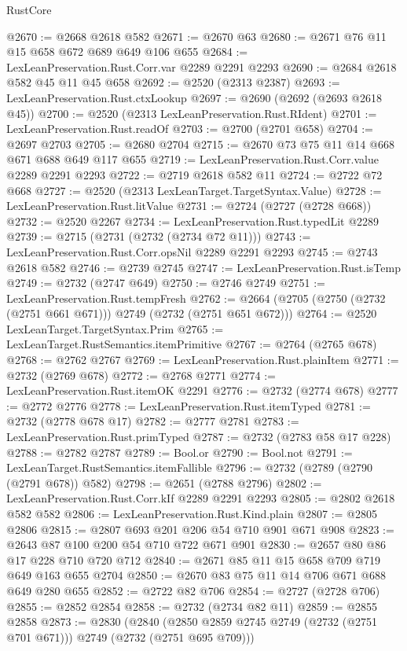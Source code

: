 \begin{lexlean}{RustCore}
\begin{coremodule}
@2670 := @2668 @2618 @582
@2671 := @2670 @63
@2680 := @2671 @76 @11 @15 @658 @672 @689 @649 @106 @655
@2684 := LexLeanPreservation.Rust.Corr.var @2289 @2291 @2293
@2690 := @2684 @2618 @582 @45 @11 @45 @658
@2692 := @2520 (@2313 @2387)
@2693 := LexLeanPreservation.Rust.ctxLookup
@2697 := @2690 (@2692 (@2693 @2618 @45))
@2700 := @2520 (@2313 LexLeanPreservation.Rust.RIdent)
@2701 := LexLeanPreservation.Rust.readOf
@2703 := @2700 (@2701 @658)
@2704 := @2697 @2703
@2705 := @2680 @2704
@2715 := @2670 @73 @75 @11 @14 @668 @671 @688 @649 @117 @655
@2719 := LexLeanPreservation.Rust.Corr.value @2289 @2291 @2293
@2722 := @2719 @2618 @582 @11
@2724 := @2722 @72 @668
@2727 := @2520 (@2313 LexLeanTarget.TargetSyntax.Value)
@2728 := LexLeanPreservation.Rust.litValue
@2731 := @2724 (@2727 (@2728 @668))
@2732 := @2520 @2267
@2734 := LexLeanPreservation.Rust.typedLit @2289
@2739 := @2715 (@2731 (@2732 (@2734 @72 @11)))
@2743 := LexLeanPreservation.Rust.Corr.opsNil @2289 @2291 @2293
@2745 := @2743 @2618 @582
@2746 := @2739 @2745
@2747 := LexLeanPreservation.Rust.isTemp
@2749 := @2732 (@2747 @649)
@2750 := @2746 @2749
@2751 := LexLeanPreservation.Rust.tempFresh
@2762 := @2664 (@2705 (@2750 (@2732 (@2751 @661 @671))) @2749 (@2732 (@2751 @651 @672)))
@2764 := @2520 LexLeanTarget.TargetSyntax.Prim
@2765 := LexLeanTarget.RustSemantics.itemPrimitive
@2767 := @2764 (@2765 @678)
@2768 := @2762 @2767
@2769 := LexLeanPreservation.Rust.plainItem
@2771 := @2732 (@2769 @678)
@2772 := @2768 @2771
@2774 := LexLeanPreservation.Rust.itemOK @2291
@2776 := @2732 (@2774 @678)
@2777 := @2772 @2776
@2778 := LexLeanPreservation.Rust.itemTyped
@2781 := @2732 (@2778 @678 @17)
@2782 := @2777 @2781
@2783 := LexLeanPreservation.Rust.primTyped
@2787 := @2732 (@2783 @58 @17 @228)
@2788 := @2782 @2787
@2789 := Bool.or
@2790 := Bool.not
@2791 := LexLeanTarget.RustSemantics.itemFallible
@2796 := @2732 (@2789 (@2790 (@2791 @678)) @582)
@2798 := @2651 (@2788 @2796)
@2802 := LexLeanPreservation.Rust.Corr.kIf @2289 @2291 @2293
@2805 := @2802 @2618 @582 @582
@2806 := LexLeanPreservation.Rust.Kind.plain
@2807 := @2805 @2806
@2815 := @2807 @693 @201 @206 @54 @710 @901 @671 @908
@2823 := @2643 @87 @100 @200 @54 @710 @722 @671 @901
@2830 := @2657 @80 @86 @17 @228 @710 @720 @712
@2840 := @2671 @85 @11 @15 @658 @709 @719 @649 @163 @655 @2704
@2850 := @2670 @83 @75 @11 @14 @706 @671 @688 @649 @280 @655
@2852 := @2722 @82 @706
@2854 := @2727 (@2728 @706)
@2855 := @2852 @2854
@2858 := @2732 (@2734 @82 @11)
@2859 := @2855 @2858
@2873 := @2830
    (@2840 (@2850 @2859 @2745 @2749 (@2732 (@2751 @701 @671))) @2749 (@2732 (@2751 @695 @709)))

\end{coremodule}
\end{lexlean}
